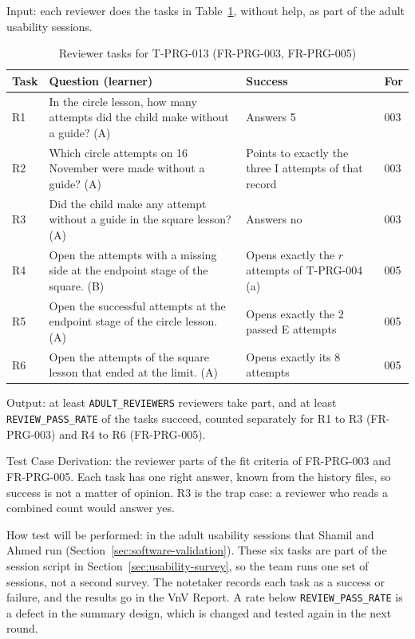 \documentclass[12pt, titlepage]{article}
\begin{document}
\begin{enumerate}
Input: each reviewer does the tasks in Table~\ref{tab:t-prg-013}, without
help, as part of the adult usability sessions.

\begin{table}[htbp]
\centering\small
\caption{Reviewer tasks for T-PRG-013 (FR-PRG-003, FR-PRG-005)}
\label{tab:t-prg-013}
\begin{tabularx}{\textwidth}{@{}l >{\raggedright\arraybackslash}X
  >{\raggedright\arraybackslash}X l@{}}
\toprule
\textbf{Task} & \textbf{Question (learner)} & \textbf{Success} &
\textbf{For}\\
\midrule
R1 & In the circle lesson, how many attempts did the child make without a
guide? (A) & Answers 5 & 003\\
R2 & Which circle attempts on 16 November were made without a guide? (A) &
Points to exactly the three I attempts of that record & 003\\
R3 & Did the child make any attempt without a guide in the square lesson?
(A) & Answers no & 003\\
R4 & Open the attempts with a missing side at the endpoint stage of the
square. (B) & Opens exactly the $r$ attempts of T-PRG-004 (a) & 005\\
R5 & Open the successful attempts at the endpoint stage of the circle
lesson. (A) & Opens exactly the 2 passed E attempts & 005\\
R6 & Open the attempts of the square lesson that ended at the limit. (A) &
Opens exactly its 8 attempts & 005\\
\bottomrule
\end{tabularx}
\end{table}

Output: at least \texttt{ADULT\_REVIEWERS} reviewers take part, and at least
\texttt{REVIEW\_PASS\_RATE} of the tasks succeed, counted separately for
R1 to R3 (FR-PRG-003) and R4 to R6 (FR-PRG-005).

Test Case Derivation: the reviewer parts of the fit criteria of FR-PRG-003
and FR-PRG-005. Each task has one right answer, known from the history
files, so success is not a matter of opinion. R3 is the trap case: a reviewer
who reads a combined count would answer yes.

How test will be performed: in the adult usability sessions that Shamil and
Ahmed run (Section~\ref{sec:software-validation}). These six tasks are part of
the session script in Section~\ref{sec:usability-survey}, so the team runs one
set of sessions, not a second survey. The notetaker records
each task as a success or failure, and the results go in the VnV Report. A
rate below \texttt{REVIEW\_PASS\_RATE} is a defect in the summary design,
which is changed and tested again in the next round.

\end{enumerate}
\end{document}
